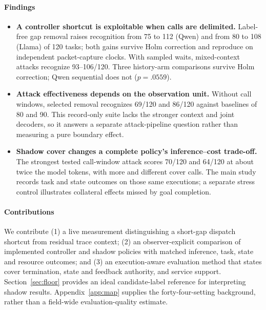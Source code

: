 \paragraph{Findings}
\begin{itemize}
\item \textbf{A controller shortcut is exploitable when calls are delimited.} Label-free gap removal raises recognition from 75 to 112 (Qwen) and from 80 to 108 (Llama) of 120 tasks; both gains survive Holm correction and reproduce on independent packet-capture clocks. With sampled waits, mixed-context attacks recognize 93--106/120. Three history-arm comparisons survive Holm correction; Qwen sequential does not ($p=.0559$).
\item \textbf{Attack effectiveness depends on the observation unit.} Without call windows, selected removal recognizes 69/120 and 86/120 against baselines of 80 and 90. This record-only suite lacks the stronger context and joint decoders, so it answers a separate attack-pipeline question rather than measuring a pure boundary effect.
\item \textbf{Shadow cover changes a complete policy's inference--cost trade-off.} The strongest tested call-window attack scores 70/120 and 64/120 at about twice the model tokens, with more and different cover calls. The main study records task and state outcomes on those same executions; a separate stress control illustrates collateral effects missed by goal completion.
\end{itemize}

\paragraph{Contributions}
We contribute (1) a live measurement distinguishing a short-gap dispatch shortcut from residual trace context; (2) an observer-explicit comparison of implemented controller and shadow policies with matched inference, task, state and resource outcomes; and (3) an execution-aware evaluation method that states cover termination, state and feedback authority, and service support. Section~\ref{sec:floor} provides an ideal candidate-label reference for interpreting shadow results. Appendix~\ref{app:map} supplies the forty-four-setting background, rather than a field-wide evaluation-quality estimate.
